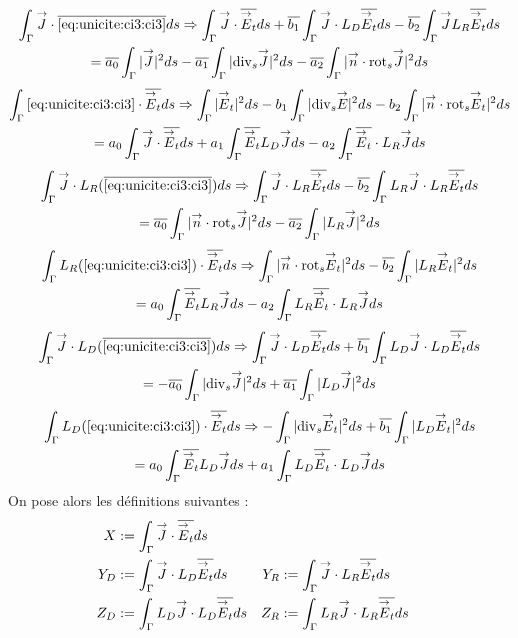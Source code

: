 \begin{multline}
\label{eq:unicite:ci3:csu3-1}
\int_\Gamma \vJ\cdot\conj{\eqref{eq:unicite:ci3:ci3}}ds \Rightarrow
\int_\Gamma \vJ \cdot \conj{\vE_t} ds  + \conj{b_1} \int_\Gamma \vJ\cdot L_D\conj{\vE_t} ds - \conj{b_2} \int_\Gamma \vJ L_R\conj{\vE_t} ds \\
= \conj{a_0} \int_\Gamma |\vJ|^2ds - \conj{a_1} \int_\Gamma |\tdivs \vJ|^2 ds - \conj{a_2} \int_\Gamma |\vn \cdot \trots \vJ|^2 ds
\end{multline}
\begin{multline}
\label{eq:unicite:ci3:csu3-2}
\int_\Gamma \eqref{eq:unicite:ci3:ci3} \cdot \conj{\vE_t} ds \Rightarrow
\int_\Gamma |\vE_t|^2 ds  - b_1 \int_\Gamma | \tdivs \vE |^2 ds - b_2 \int_\Gamma | \vn \cdot \trots \vE_t|^2 ds \\
= a_0 \int_\Gamma \vJ\cdot \conj{\vE_t}ds + a_1 \int_\Gamma \conj{\vE_t} L_D \vJ ds - a_2 \int_\Gamma \conj{\vE_t} \cdot L_R \vJ ds
\end{multline}
\begin{multline}
\label{eq:unicite:ci3:csu3-3}
\int_\Gamma \vJ \cdot L_R ( \conj{\eqref{eq:unicite:ci3:ci3}} ) ds \Rightarrow
\int_\Gamma \vJ \cdot L_R \conj{\vE_t} ds  - \conj{b_2} \int_\Gamma L_R \vJ \cdot L_R \conj{\vE_t} ds \\
=  \conj{a_0} \int_\Gamma |\vn \cdot \trots \vJ|^2ds - \conj{a_2} \int_\Gamma | L_R \vJ|^2 ds
\end{multline}
\begin{multline}
\label{eq:unicite:ci3:csu3-4}
\int_\Gamma  L_R ( \eqref{eq:unicite:ci3:ci3} ) \cdot \conj{\vE_t} ds \Rightarrow
\int_\Gamma | \vn \cdot \trots \vE_t |^2 ds  - \conj{b_2} \int_\Gamma | L_R \vE_t|^2 ds \\
= a_0 \int_\Gamma \conj{\vE_t} L_R \vJ ds - a_2 \int_\Gamma L_R \conj{\vE_t} \cdot L_R \vJ ds
\end{multline}
\begin{multline}
\label{eq:unicite:ci3:csu3-5}
\int_\Gamma \vJ \cdot L_D ( \conj{\eqref{eq:unicite:ci3:ci3}} ) ds \Rightarrow
\int_\Gamma \vJ \cdot L_D \conj{\vE_t} ds  + \conj{b_1} \int_\Gamma L_D \vJ \cdot L_D \conj{\vE_t} ds \\
= - \conj{a_0} \int_\Gamma |\tdivs \vJ|^2ds + \conj{a_1} \int_\Gamma | L_D \vJ|^2 ds
\end{multline}
\begin{multline}
\label{eq:unicite:ci3:csu3-6}
\int_\Gamma  L_D ( \eqref{eq:unicite:ci3:ci3} ) \cdot \conj{\vE_t} ds \Rightarrow
-\int_\Gamma | \tdivs \vE_t |^2 ds  + \conj{b_1} \int_\Gamma | L_D \vE_t|^2 ds \\
= a_0 \int_\Gamma \conj{\vE_t} L_D \vJ ds + a_1 \int_\Gamma L_D \conj{\vE_t} \cdot L_D \vJ ds
\end{multline}
On pose alors les définitions suivantes :
\begin{align*}
X&:= \int_\Gamma {\overset{\rightarrow}{J}} \cdot {\overline{{\overset{\rightarrow}{E}}_t}} ds\\
Y_D&:= \int_\Gamma {\overset{\rightarrow}{J}} \cdot L_D {\overline{{\overset{\rightarrow}{E}}_t}} ds
&Y_R&:= \int_\Gamma {\overset{\rightarrow}{J}} \cdot L_R {\overline{{\overset{\rightarrow}{E}}_t}} ds\\
Z_D&:= \int_\Gamma L_D {\overset{\rightarrow}{J}} \cdot L_D {\overline{{\overset{\rightarrow}{E}}_t}} ds
&Z_R&:= \int_\Gamma L_R {\overset{\rightarrow}{J}} \cdot L_R {\overline{{\overset{\rightarrow}{E}}_t}} ds
\end{align*}

